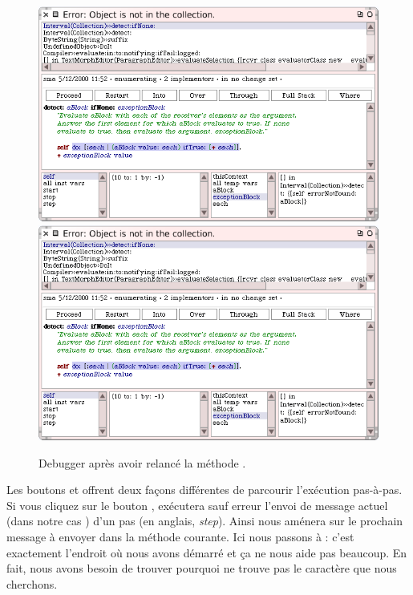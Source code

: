 \documentclass[a4paper,10pt,twoside]{book}
\begin{document}
\begin{figure}[btp]
	\begin{center}
	\ifluluelse
		{\includegraphics[width=\textwidth]{RestartDetectIfNone}}
		{\includegraphics[scale=0.7]{RestartDetectIfNone}}
	\end{center}
	\caption{Debugger apr\`es avoir relanc\'e la m\'ethode .}
	\label{fig:RestartDetectIfNone}
\end{figure}

Les boutons  et  offrent deux fa\c{c}ons diff\'erentes de parcourir l'ex\'ecution pas-\`a-pas.
Si vous cliquez sur le bouton , \sq ex\'ecutera sauf erreur
l'envoi de message actuel (dans notre cas ) d'un pas (en anglais, \emph{step}).
Ainsi  nous am\'enera sur 
le prochain message \`a envoyer dans la m\'ethode courante. Ici nous
passons \`a : c'est exactement l'endroit o\`u nous avons d\'emarr\'e
et \c{c}a ne nous aide pas beaucoup.
En fait, nous avons besoin de trouver pourquoi  ne trouve pas
le caract\`ere que nous cherchons.
\end{document}
